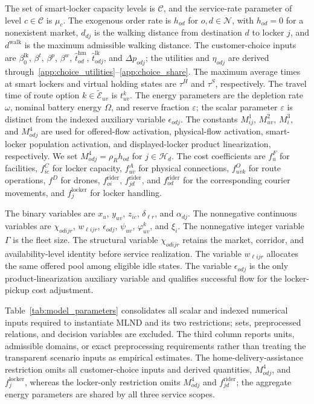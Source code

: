 \documentclass[final,3p,authoryear]{elsarticle}
\begin{document}
The set of smart-locker capacity levels is $\mathcal C$, and the service-rate parameter of level $c\in\mathcal C$ is $\mu_c$.
The exogenous order rate is $h_{od}$ for $o,d\in\mathcal N$, with $h_{od}=0$ for a nonexistent market, $d_{dj}$ is the walking distance from destination $d$ to locker $j$, and $d^{\mathrm{walk}}$ is the maximum admissible walking distance.
The customer-choice inputs are $\beta_0^{\mathrm{lk}}$, $\beta^{t}$, $\beta^{p}$, $\beta^{w}$, $\widehat t_{od}^{\mathrm{hm}}$, $\widehat t_{odj}^{\mathrm{lk}}$, and $\Delta p_{odj}$; the utilities and $\eta_{odj}$ are derived through~\eqref{app:choice_utilities}--\eqref{app:choice_share}.
The maximum average times at smart lockers and virtual holding states are $\tau^H$ and $\tau^S$, respectively.
The travel time of route option $k\in\widetilde{\mathcal E}_{uv}$ is $t_{uv}^{k}$.
The energy parameters are the depletion rate $\omega$, nominal battery energy $\Omega$, and reserve fraction $\varepsilon$; the scalar parameter $\varepsilon$ is distinct from the indexed auxiliary variable $\epsilon_{odj}$.
The constants $M^1_{ij}$, $M^2_{uv}$, $M^3_i$, and $M^4_{odj}$ are used for offered-flow activation, physical-flow activation, smart-locker population activation, and displayed-locker product linearization, respectively.
We set $M^4_{odj}=\rho_Rh_{od}$ for $j\in\mathcal H_d$.
The cost coefficients are $f_u^{F}$ for facilities, $f_{ic}^{C}$ for locker capacity, $f_{uv}^{A}$ for physical connections, $f_{uvk}^{O}$ for route operations, $f^{D}$ for drones, $f_{oi}^{\mathrm{rider}}$, $f_{jd}^{\mathrm{rider}}$, and $f_{od}^{\mathrm{rider}}$ for the corresponding courier movements, and $f_j^{\mathrm{locker}}$ for locker handling.

The binary variables are $x_u$, $y_{uv}$, $z_{ic}$, $\delta_{\ell r}$, and $\alpha_{dj}$.
The nonnegative continuous variables are $\chi_{odijr}$, $w_{\ell i j r}$, $\epsilon_{odj}$, $\psi_{uv}$, $\varphi_{uv}^{k}$, and $\xi_i$.
The nonnegative integer variable $\Gamma$ is the fleet size.
The structural variable $\chi_{odijr}$ retains the market, corridor, and availability-level identity before service realization.
The variable $w_{\ell i j r}$ allocates the same offered pool among eligible idle states.
The variable $\epsilon_{odj}$ is the only product-linearization auxiliary variable and qualifies successful flow for the locker-pickup cost adjustment.

Table~\ref{tab:model_parameters} consolidates all scalar and indexed numerical inputs required to instantiate MLND and its two restrictions; sets, preprocessed relations, and decision variables are excluded.
The third column reports units, admissible domains, or exact preprocessing requirements rather than treating the transparent scenario inputs as empirical estimates.
The home-delivery-assistance restriction omits all customer-choice inputs and derived quantities, $M^4_{odj}$, and $f_j^{\mathrm{locker}}$, whereas the locker-only restriction omits $M^4_{odj}$ and $f_{jd}^{\mathrm{rider}}$; the aggregate energy parameters are shared by all three service scopes.
\end{document}
